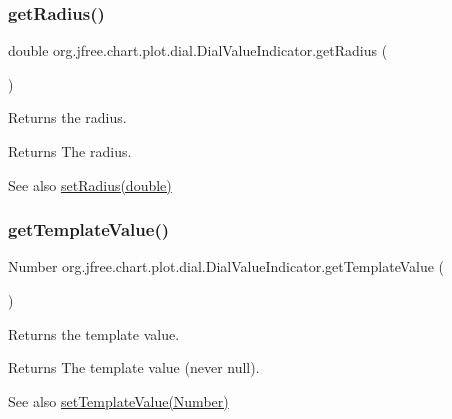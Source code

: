 \subsubsection{\texorpdfstring{get\+Radius()}{getRadius()}}
{\footnotesize\ttfamily double org.\+jfree.\+chart.\+plot.\+dial.\+Dial\+Value\+Indicator.\+get\+Radius (\begin{DoxyParamCaption}{ }\end{DoxyParamCaption})}

Returns the radius.

\begin{DoxyReturn}{Returns}
The radius.
\end{DoxyReturn}
\begin{DoxySeeAlso}{See also}
\mbox{\hyperlink{classorg_1_1jfree_1_1chart_1_1plot_1_1dial_1_1_dial_value_indicator_a61cf04616e22afc08ab29777c4b8762c}{set\+Radius(double)}} 
\end{DoxySeeAlso}
\mbox{\label{classorg_1_1jfree_1_1chart_1_1plot_1_1dial_1_1_dial_value_indicator_ac3e29f98b70fd192b0c2927c9025f7ae}} 
\subsubsection{\texorpdfstring{get\+Template\+Value()}{getTemplateValue()}}
{\footnotesize\ttfamily Number org.\+jfree.\+chart.\+plot.\+dial.\+Dial\+Value\+Indicator.\+get\+Template\+Value (\begin{DoxyParamCaption}{ }\end{DoxyParamCaption})}

Returns the template value.

\begin{DoxyReturn}{Returns}
The template value (never {\ttfamily null}).
\end{DoxyReturn}
\begin{DoxySeeAlso}{See also}
\mbox{\hyperlink{classorg_1_1jfree_1_1chart_1_1plot_1_1dial_1_1_dial_value_indicator_a9b3ddc35fb5d1372514575daeac445ed}{set\+Template\+Value(\+Number)}} 
\end{DoxySeeAlso}
\mbox{\label{classorg_1_1jfree_1_1chart_1_1plot_1_1dial_1_1_dial_value_indicator_a7be9dd7f474e88ad4b961d8ba6e02d4b}} 
